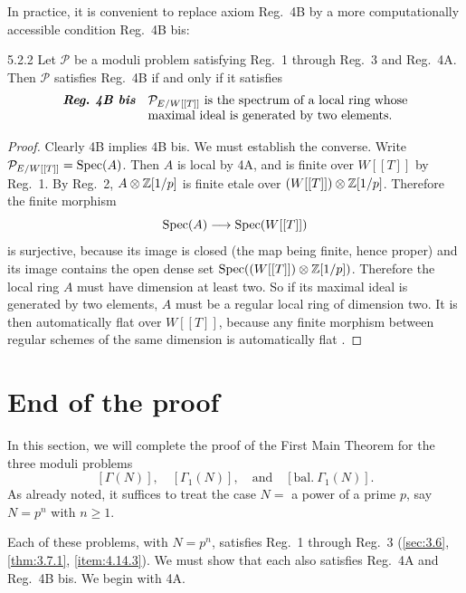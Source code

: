 In practice, it is convenient to replace axiom Reg.~4B by a more computationally accessible condition Reg.~4B bis:

\begin{customprop}{5.2.2}\label{prop:5.2.2}
Let $\mathcal{P}$ be a moduli problem satisfying Reg.~1 through Reg.~3 and Reg.~4A. Then $\mathcal{P}$ satisfies Reg.~4B if and only if it satisfies
\[
\begin{array}{@{}l@{\quad}l@{}}
\textbf{\itshape Reg.\ 4B bis} & \mathcal{P}_{E/W[[T]]} \text{ is the spectrum of a local ring whose} \\
& \text{maximal ideal is generated by two elements.}
\end{array}
\]
\end{customprop}

\begin{proof}
Clearly 4B implies 4B bis. We must establish the converse. Write $\mathcal{P}_{E/W[[T]]} = \operatorname{Spec}(A)$. Then $A$ is local by 4A, and is finite over $W[[T]]$ by Reg.~1. By Reg.~2, $A\otimes\mathbb{Z}[1/p]$ is finite etale over $(W[[T]])\otimes\mathbb{Z}[1/p]$. Therefore the finite morphism
\[
\operatorname{Spec}(A) \longrightarrow \operatorname{Spec}(W[[T]])
\]
is surjective, because its image is closed (the map being finite, hence proper) and its image contains the open dense set $\operatorname{Spec}((W[[T]])\otimes\mathbb{Z}[1/p])$. Therefore the local ring $A$ must have dimension at least two. So if its maximal ideal is generated by two elements, $A$ must be a regular local ring of dimension two. It is then automatically flat over $W[[T]]$, because any finite morphism between regular schemes of the same dimension is automatically flat \cite[V, 3.6]{AK1}.
\end{proof}

\section{End of the proof}
\label{sec:5.3}

In this section, we will complete the proof of the First Main Theorem for the three moduli problems
\[
[\Gamma(N)],\quad [\Gamma_1(N)],\quad\text{and}\quad [\mathrm{bal.}\ \Gamma_1(N)].
\]
As already noted, it suffices to treat the case $N =$ a power of a prime $p$, say $N = p^n$ with $n \ge 1$.

Each of these problems, with $N = p^n$, satisfies Reg.~1 through Reg.~3 (\ref{sec:3.6}, \ref{thm:3.7.1}, \ref{item:4.14.3}). We must show that each also satisfies Reg.~4A and Reg.~4B bis. We begin with 4A.


